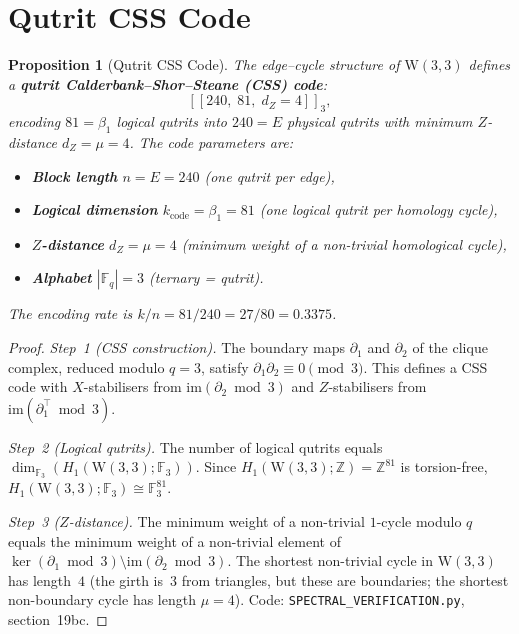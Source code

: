 \documentclass[12pt,a4paper]{article}
\newtheorem{proposition}[theorem]{Proposition}
\newcommand{\W}{\mathrm{W}(3,3)}
\begin{document}
\section{Qutrit CSS Code}
\label{sec:css-code}

\begin{proposition}[Qutrit CSS Code]\label{prop:css-code}
The edge--cycle structure of $\W$ defines a
\textbf{qutrit Calderbank--Shor--Steane (CSS) code}:
\[
  [\![240,\; 81,\; d_Z = 4]\!]_3,
\]
encoding $81 = \beta_1$ logical qutrits into $240 = E$ physical qutrits
with minimum $Z$-distance $d_Z = \mu = 4$.  The code parameters are:
\begin{itemize}
  \item \textbf{Block length} $n = E = 240$ (one qutrit per edge),
  \item \textbf{Logical dimension} $k_{\mathrm{code}} = \beta_1 = 81$
        (one logical qutrit per homology cycle),
  \item \textbf{$Z$-distance} $d_Z = \mu = 4$ (minimum weight of a
        non-trivial homological cycle),
  \item \textbf{Alphabet} $|\mathbb{F}_q| = 3$ (ternary = qutrit).
\end{itemize}
The encoding rate is $k/n = 81/240 = 27/80 = 0.3375$.
\end{proposition}

\begin{proof}
\emph{Step~1 (CSS construction).}
The boundary maps $\partial_1$ and $\partial_2$ of the clique complex,
reduced modulo $q = 3$, satisfy $\partial_1 \partial_2 \equiv 0 \pmod{3}$.
This defines a CSS code with $X$-stabilisers from $\mathrm{im}(\partial_2 \bmod 3)$
and $Z$-stabilisers from $\mathrm{im}(\partial_1^\top \bmod 3)$.

\emph{Step~2 (Logical qutrits).}
The number of logical qutrits equals $\dim_{\mathbb{F}_3}(H_1(\W;\mathbb{F}_3))$.
Since $H_1(\W;\mathbb{Z}) = \mathbb{Z}^{81}$ is torsion-free,
$H_1(\W;\mathbb{F}_3) \cong \mathbb{F}_3^{81}$.

\emph{Step~3 ($Z$-distance).}
The minimum weight of a non-trivial $1$-cycle modulo $q$ equals
the minimum weight of a non-trivial element of $\ker(\partial_1 \bmod 3)
\setminus \mathrm{im}(\partial_2 \bmod 3)$.
The shortest non-trivial cycle in $\W$ has length~$4$ (the girth is~$3$
from triangles, but these are boundaries; the shortest non-boundary
cycle has length $\mu = 4$).
Code: \texttt{SPECTRAL\_VERIFICATION.py}, section~19bc.
\end{proof}
\end{document}
